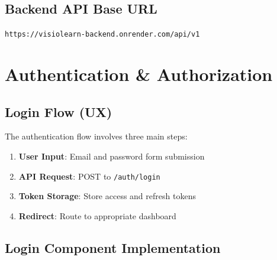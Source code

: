 \documentclass[12pt,a4paper,oneside]{article}
\begin{document}
\subsection{Backend API Base URL}

\begin{tcolorbox}[colback=lightblue, colframe=darkblue]
\texttt{https://visiolearn-backend.onrender.com/api/v1}
\end{tcolorbox}

\section{Authentication \& Authorization}

\subsection{Login Flow (UX)}

The authentication flow involves three main steps:

\begin{enumerate}
    \item \textbf{User Input}: Email and password form submission
    \item \textbf{API Request}: POST to \texttt{/auth/login}
    \item \textbf{Token Storage}: Store access and refresh tokens
    \item \textbf{Redirect}: Route to appropriate dashboard
\end{enumerate}

\subsection{Login Component Implementation}
\end{document}
